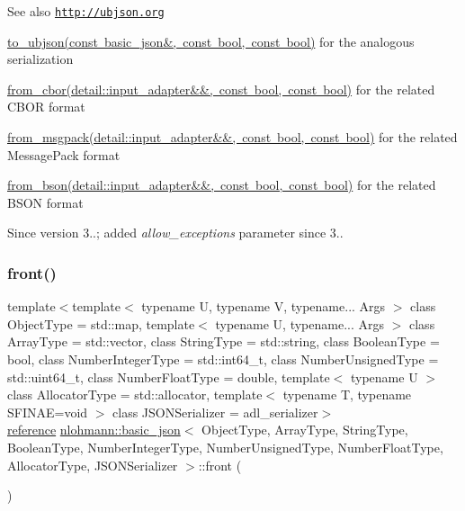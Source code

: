 \begin{DoxySeeAlso}{See also}
\href{http://ubjson.org}{\tt http\+://ubjson.\+org} 

\mbox{\hyperlink{classnlohmann_1_1basic__json_ae1ece6c2059114eac10873f13ef19185}{to\+\_\+ubjson(const basic\+\_\+json\&, const bool, const bool)}} for the analogous serialization 

\mbox{\hyperlink{classnlohmann_1_1basic__json_a1d568ba1bd6978d80db42aa76626e2cf}{from\+\_\+cbor(detail\+::input\+\_\+adapter\&\&, const bool, const bool)}} for the related C\+B\+OR format 

\mbox{\hyperlink{classnlohmann_1_1basic__json_a11458b7982adba51bc634f2f8c961e9b}{from\+\_\+msgpack(detail\+::input\+\_\+adapter\&\&, const bool, const bool)}} for the related Message\+Pack format 

\mbox{\hyperlink{classnlohmann_1_1basic__json_a0524486cd0b36a47448df882ec0d5e7b}{from\+\_\+bson(detail\+::input\+\_\+adapter\&\&, const bool, const bool)}} for the related B\+S\+ON format
\end{DoxySeeAlso}
\begin{DoxySince}{Since}
version 3..; added {\itshape allow\+\_\+exceptions} parameter since 3.. 
\end{DoxySince}
\mbox{\label{classnlohmann_1_1basic__json_a3acba9c6ceb7214e565fe08c3ba5b352}} 
\subsubsection{\texorpdfstring{front()}{front()}\hspace{0.1cm}{\footnotesize\ttfamily [1/2]}}
{\footnotesize\ttfamily template$<$template$<$ typename U, typename V, typename... Args $>$ class Object\+Type = std\+::map, template$<$ typename U, typename... Args $>$ class Array\+Type = std\+::vector, class String\+Type  = std\+::string, class Boolean\+Type  = bool, class Number\+Integer\+Type  = std\+::int64\+\_\+t, class Number\+Unsigned\+Type  = std\+::uint64\+\_\+t, class Number\+Float\+Type  = double, template$<$ typename U $>$ class Allocator\+Type = std\+::allocator, template$<$ typename T, typename S\+F\+I\+N\+A\+E=void $>$ class J\+S\+O\+N\+Serializer = adl\+\_\+serializer$>$ \\
\mbox{\hyperlink{classnlohmann_1_1basic__json_ac6a5eddd156c776ac75ff54cfe54a5bc}{reference}} \mbox{\hyperlink{classnlohmann_1_1basic__json}{nlohmann\+::basic\+\_\+json}}$<$ Object\+Type, Array\+Type, String\+Type, Boolean\+Type, Number\+Integer\+Type, Number\+Unsigned\+Type, Number\+Float\+Type, Allocator\+Type, J\+S\+O\+N\+Serializer $>$\+::front (\begin{DoxyParamCaption}{ }\end{DoxyParamCaption})\hspace{0.3cm}{\ttfamily [inline]}}



